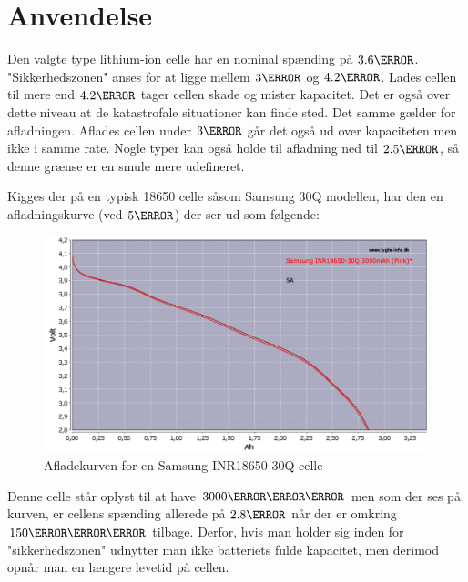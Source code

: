 
\section{Anvendelse}
Den valgte type lithium-ion celle har en nominal spænding på $3.6\volt$. "Sikkerhedszonen" \space anses for at ligge mellem $3\volt$ og $4.2\volt$. Lades cellen til mere end $4.2\volt$ tager cellen skade og mister kapacitet. Det er også over dette niveau at de katastrofale situationer kan finde sted. Det samme gælder for afladningen. Aflades cellen under $3\volt$ går det også ud over kapaciteten men ikke i samme rate. Nogle typer kan også holde til afladning ned til $2.5\volt$, så denne grænse er en smule mere udefineret.\\

Kigges der på en typisk 18650 celle såsom Samsung 30Q modellen, har den en afladningskurve (ved $5\ampere$) der ser ud som følgende: 

\begin{figure}[h]
\centering
\includegraphics[width=15cm]{billeder/samsung-inr18650-discharge.png}
\caption{Afladekurven for en Samsung INR18650 30Q celle\protect\footnotemark}
\label{fig:30q_discharge}
\end{figure}

Denne celle står oplyst til at have $3000\milli\ampere\hour$ men som der ses på kurven, er cellens spænding allerede på $2.8\volt$ når der er omkring $150\milli\ampere\hour$ tilbage. Derfor, hvis man holder sig inden for "sikkerhedszonen" \space udnytter man ikke batteriets fulde kapacitet, men derimod opnår man en længere levetid på cellen. \\

